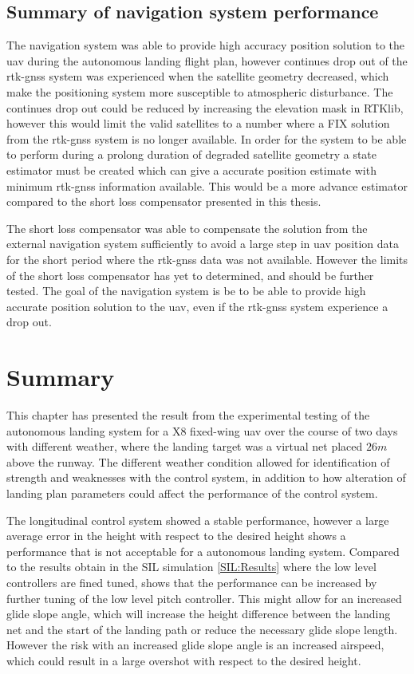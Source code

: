 \subsection{Summary of navigation system performance}
The navigation system was able to provide high accuracy position solution to the \gls{uav} during the autonomous landing flight plan, however continues drop out of the \gls{rtk-gnss} system was experienced when the satellite geometry decreased, which make the positioning system more susceptible to atmospheric disturbance. The continues drop out could be reduced by increasing the elevation mask in RTKlib, however this would limit the valid satellites to a number where a FIX solution from the \gls{rtk-gnss} system is no longer available. In order for the system to be able to perform during a prolong duration of degraded satellite geometry a state estimator must be created which can give a accurate position estimate with minimum \gls{rtk-gnss} information available. This would be a more advance estimator compared to the short loss compensator presented in this thesis.

The short loss compensator was able to compensate the solution from the external navigation system sufficiently to avoid a large step in \gls{uav} position data for the short period where the \gls{rtk-gnss} data was not available. However the limits of the short loss compensator has yet to determined, and should be further tested. The goal of the navigation system is be to be able to provide high accurate position solution to the \gls{uav}, even if the \gls{rtk-gnss} system experience a drop out.
\section{Summary}
This chapter has presented the result from the experimental testing of the autonomous landing system for a X8 fixed-wing \gls{uav} over the course of two days with different weather, where the landing target was a virtual net placed $26 m$ above the runway. The different weather condition allowed for identification of strength and weaknesses with the control system, in addition to how alteration of landing plan parameters could affect the performance of the control system.

The longitudinal control system showed a stable performance, however a large average error in the height with respect to the desired height shows a performance that is not acceptable for a autonomous landing system. Compared to the results obtain in the SIL simulation \ref{SIL:Results} where the low level controllers are fined tuned, shows that the performance can be increased by further tuning of the low level pitch controller. This might allow for an increased glide slope angle, which will increase the height difference between the landing net and the start of the landing path or reduce the necessary glide slope length. However the risk with an increased glide slope angle is an increased airspeed, which could result in a large overshot with respect to the desired height. 

